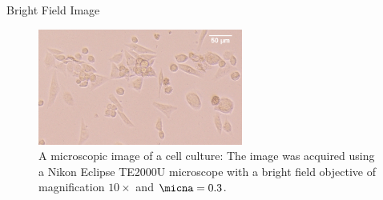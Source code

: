 \begin{frame}{Bright Field Image}
	\begin{figure}
		\centering
		\includegraphics[width=0.6\textwidth]{images/cells1bf}
		\caption{A microscopic image of a cell culture: The image was acquired using a Nikon Eclipse TE2000U microscope with a bright field objective of magnification $10 \times$ and $\micna = 0.3$.}
		\label{fig:mic:cells1bf}
	\end{figure}
\end{frame}



